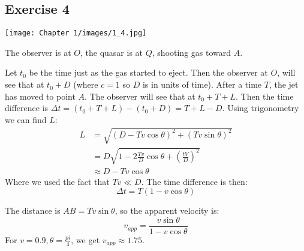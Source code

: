 \subsection{Exercise 4}



\texttt{[image: Chapter 1/images/1\_4.jpg]}

The observer is at $O$, the quasar is at $Q$, shooting gas toward $A$.

Let $t_0$ be the time just as the gas started to eject. Then the observer at $O$, will see that at $t_0+D$ (where $c=1$ so $D$ is in units of time). After a time $T$, the jet has moved to point $A$. The observer will see that at $t_0+T+L$. Then the time difference is $\Delta t = (t_0+T+L)-(t_0+D)=T+L-D$. Using trigonometry we can find $L$:
\begin{align}
    L &= \sqrt{(D-Tv\cos{\theta})^2 + (Tv\sin{\theta})^2} \\
    &= D\sqrt{1-2\frac{Tv}{D}\cos{\theta} + \left(\frac{tV}{D}\right)^2} \\
    &\approx D - Tv\cos{\theta}
\end{align}
Where we used the fact that $Tv\ll D$. The time difference is then:
\begin{equation}
    \Delta t = T ( 1 - v\cos{\theta})
\end{equation}

The distance is $AB=Tv\sin{\theta}$, so the apparent velocity is:
\begin{equation}
    v_{app} = \frac{v\sin{\theta}}{1-v\cos{\theta}} 
\end{equation}
For $v=0.9,\theta=\frac{pi}{4}$, we get $v_{app}\approx1.75$.
